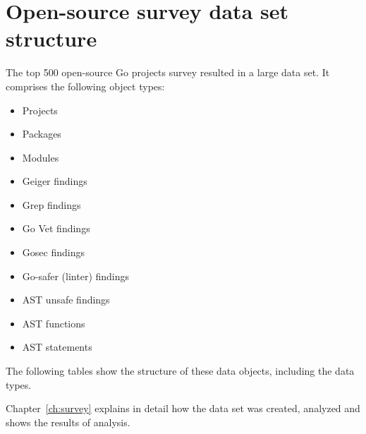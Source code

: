 
\chapter{Open-source survey data set structure}\label{ch:data-structure}

The top 500 open-source Go projects survey resulted in a large data set.
It comprises the following object types:

\begin{itemize}
    \item Projects
    \item Packages
    \item Modules
    \item Geiger findings
    \item Grep findings
    \item Go Vet findings
    \item Gosec findings
    \item Go-safer (linter) findings
    \item AST unsafe findings
    \item AST functions
    \item AST statements
\end{itemize}

The following tables show the structure of these data objects, including the data types.

Chapter~\ref{ch:survey} explains in detail how the data set was created, analyzed and shows the results of analysis.

